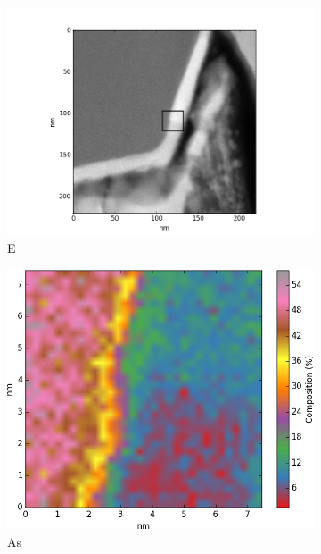 \begin{figure}
	\centering
		\begin{subfigure}{0.5\textwidth}
		\includegraphics[width=\textwidth]{fig/q/D-E/E}
		\caption{E}
		\label{fig:E-overview}
	\end{subfigure}%
	\hfill
	\begin{subfigure}{0.45\textwidth}
		\includegraphics[width=\textwidth]{fig/q/D-E-trim/E_heatedGeKlineHEATMAP/As_zeta}
		\caption{As}
		\label{fig:Eas}
	\end{subfigure}
	\centering
	\begin{subfigure}{0.45\textwidth}

\end{subfigure}
\end{figure}
